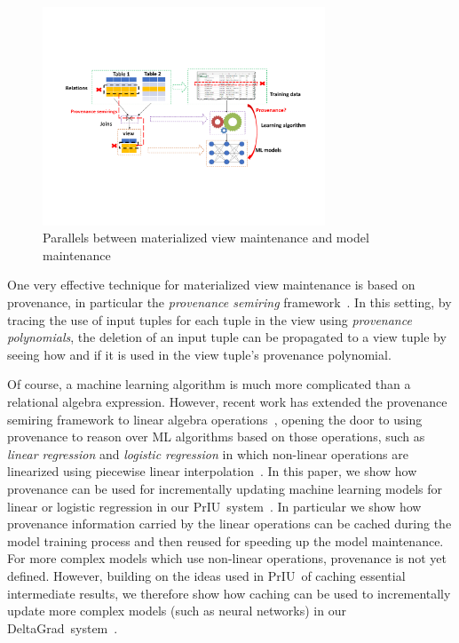 \documentclass[11pt]{article}
\newcommand{\priu}{PrIU}
\newcommand{\deltagrad}{DeltaGrad}
\begin{document}
\begin{figure}
\begin{center}
\includegraphics[width=0.75\textwidth, bb = 100pt 0pt 600pt 250pt]{figs/Updating -rev.pdf}
\caption{Parallels between materialized view maintenance 
and model maintenance}
\label{fig: view-update}
\end{center}
\end{figure}

One very effective technique for materialized view maintenance is based on provenance, in particular the {\em provenance semiring} framework~\cite{GreenKT07}.  In this setting, by tracing the use of input tuples for each tuple in the view using {\em provenance polynomials}, the deletion of an input tuple can be propagated to a view tuple by seeing how and if it is used in the view tuple's provenance polynomial.

Of course, a machine learning algorithm is much more complicated than a relational algebra expression.  However, recent work has extended the provenance semiring framework to linear algebra operations~\cite{yan2016fine}, opening the door to using provenance to reason over ML algorithms based on those operations, such as {\em linear regression} and {\em logistic regression} in which non-linear operations are linearized using piecewise linear interpolation~\cite{wu2020priu}.  
In this paper, we show how provenance can be used for incrementally updating machine learning models for linear or logistic regression in our \priu\ system~\cite{wu2020priu}.  In particular we show how provenance information carried by the linear operations can be cached during the model training process and then reused for speeding up the model maintenance.
For more complex models which use non-linear operations, provenance is not yet defined. However, building on the ideas used in \priu\ of caching essential intermediate results, we therefore show how caching can be used to incrementally update more complex models (such as neural networks) in
our \deltagrad\ system~\cite{wu2020deltagrad}.
\end{document}
